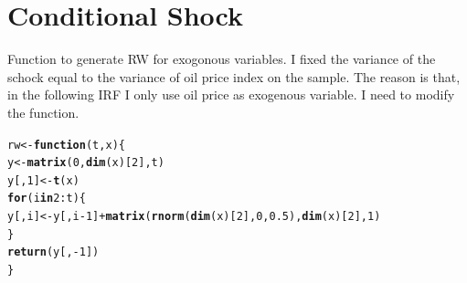 \documentclass[11pt,oneside, a4paper]{amsart}\usepackage[]{graphicx}\usepackage[]{color}
\makeatletter
\newcommand{\hlnum}[1]{\textcolor[rgb]{0.686,0.059,0.569}{#1}}%
\newcommand{\hlopt}[1]{\textcolor[rgb]{0,0,0}{#1}}%
\newcommand{\hlstd}[1]{\textcolor[rgb]{0.345,0.345,0.345}{#1}}%
\newcommand{\hlkwa}[1]{\textcolor[rgb]{0.161,0.373,0.58}{\textbf{#1}}}%
\newcommand{\hlkwb}[1]{\textcolor[rgb]{0.69,0.353,0.396}{#1}}%
\newcommand{\hlkwc}[1]{\textcolor[rgb]{0.333,0.667,0.333}{#1}}%
\newcommand{\hlkwd}[1]{\textcolor[rgb]{0.737,0.353,0.396}{\textbf{#1}}}%
\newenvironment{kframe}{%
 \def\at@end@of@kframe{}%
 \ifinner\ifhmode%
  \def\at@end@of@kframe{\end{minipage}}%
  \begin{minipage}{\columnwidth}%
 \fi\fi%
 \def\FrameCommand##1{\hskip\@totalleftmargin \hskip-\fboxsep
 \colorbox{shadecolor}{##1}\hskip-\fboxsep
     \hskip-\linewidth \hskip-\@totalleftmargin \hskip\columnwidth}%
 \MakeFramed {\advance\hsize-\width
   \@totalleftmargin\z@ \linewidth\hsize
   \@setminipage}}%
 {\par\unskip\endMakeFramed%
 \at@end@of@kframe}
\newenvironment{knitrout}{}{} %
\makeatother
\begin{document}
\section*{Conditional Shock}

Function to generate RW for exogonous variables. I fixed the variance of the schock equal to the variance of oil price index on the sample. The reason is that, in the following IRF I only use oil price as exogenous variable. I need to modify the function. 

\begin{knitrout}
\color{fgcolor}\begin{kframe}
\begin{alltt}
\hlstd{rw}\hlkwb{<-}\hlkwa{function}\hlstd{(}\hlkwc{t}\hlstd{,}\hlkwc{x}\hlstd{)\{}
  \hlstd{y}\hlkwb{<-}\hlkwd{matrix}\hlstd{(}\hlnum{0}\hlstd{,}\hlkwd{dim}\hlstd{(x)[}\hlnum{2}\hlstd{],t)}
  \hlstd{y[,}\hlnum{1}\hlstd{]}\hlkwb{<-}\hlkwd{t}\hlstd{(x)}
  \hlkwa{for}\hlstd{(i} \hlkwa{in} \hlnum{2}\hlopt{:}\hlstd{t)\{}
    \hlstd{y[,i]} \hlkwb{<-} \hlstd{y[,i}\hlopt{-}\hlnum{1}\hlstd{]} \hlopt{+} \hlkwd{matrix}\hlstd{(}\hlkwd{rnorm}\hlstd{(}\hlkwd{dim}\hlstd{(x)[}\hlnum{2}\hlstd{],}\hlnum{0}\hlstd{,}\hlnum{0.5}\hlstd{),}\hlkwd{dim}\hlstd{(x)[}\hlnum{2}\hlstd{],}\hlnum{1}\hlstd{)}
  \hlstd{\}}
  \hlkwd{return}\hlstd{(y[,}\hlopt{-}\hlnum{1}\hlstd{])}
\hlstd{\}}
\end{alltt}
\end{kframe}
\end{knitrout}
\end{document}
